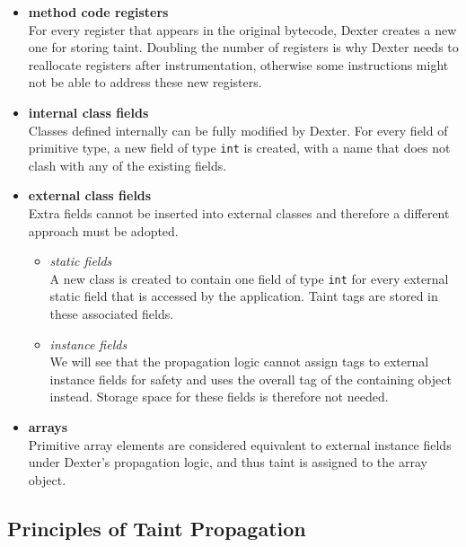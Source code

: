 \documentclass[12pt,twoside,notitlepage]{report}
\begin{document}
\begin{itemize}

\item \textbf{method code registers} \\
For every register that appears in the original bytecode, Dexter creates a new one for storing taint. Doubling the number of registers is why Dexter needs to reallocate registers after instrumentation, otherwise some instructions might not be able to address these new registers.

\item \textbf{internal class fields} \\
Classes defined internally can be fully modified by Dexter. For every field of primitive type, a new field of type \verb$int$ is created, with a name that does not clash with any of the existing fields.

\item \textbf{external class fields} \\
Extra fields cannot be inserted into external classes and therefore a different approach must be adopted. 
\begin{itemize}
\item \textit{static fields} \\
A new class is created to contain one field of type \verb$int$ for every external static field that is accessed by the application. Taint tags are stored in these associated fields.

\item \textit{instance fields} \\
We will see that the propagation logic cannot assign tags to external instance fields for safety and uses the overall tag of the containing object instead. Storage space for these fields is therefore not needed.

\end{itemize}

\item \textbf{arrays} \\
Primitive array elements are considered equivalent to external instance fields under Dexter's propagation logic, and thus taint is assigned to the array object.

\end{itemize}

\subsection{Principles of Taint Propagation}
\end{document}
